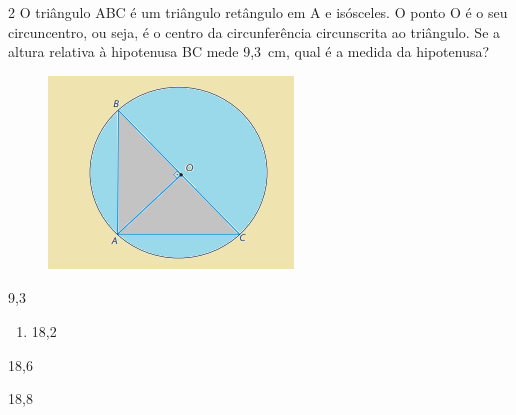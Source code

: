 





\num{2} O triângulo ABC é um triângulo retângulo em A e isósceles. O ponto O
é o seu circuncentro, ou seja, é o centro da circunferência circunscrita
ao triângulo. Se a altura relativa à hipotenusa BC mede 9,3~cm, qual é a
medida da hipotenusa?

\begin{figure}[H]
\centering\includegraphics[width=2.5625in,height=2.02083in]{./imgSAEB_8_MAT/media/image35.png}
\end{figure}
\item 9,3

\begin{enumerate}
\def\labelenumi{\alph{enumi})}
\setcounter{enumi}{1}
\tightlist
\item
  18,2
\end{enumerate}
\item 18,6
\item 18,8


